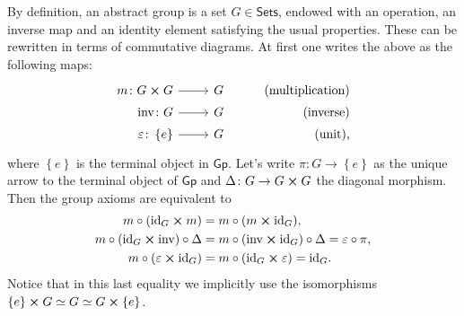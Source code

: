 \begin{rem}[]
	By definition, an abstract group is a set $G \in \mathsf{Sets}$, endowed with an operation,
	an inverse map and an identity element satisfying the usual properties.
	These can be rewritten in terms of commutative diagrams.
	At first one writes the above as the following maps:
	\begin{equation*}
	\begin{tikzcd}[row sep = 0ex
         ,/tikz/column 1/.append style={anchor=base east}
         ,/tikz/column 2/.append style={anchor=base west}
         ,/tikz/column 3/.append style={anchor=base east}]
			m\colon G \cross G \arrow[r, "", rightarrow] &
			G & \text{(multiplication)} \\
			\mathrm{inv}\colon G \arrow[r, "", rightarrow] &
			G & \text{(inverse)} \\
			\varepsilon \colon \left\{ e \right\} \arrow[r, "", rightarrow] &
			G & \text{(unit),}
		\end{tikzcd}
	\end{equation*} 
	where $\left\{ e \right\}$ is the terminal object in $\mathsf{Gp}$.
	Let's write $\pi\colon G \to \left\{ e \right\}$
	as the unique arrow to the terminal object of $\mathsf{Gp}$
	and $\Delta\colon G \to G \cross G$ the diagonal morphism.
	Then the group axioms are equivalent to
	\begin{align}\label{eq:GroupAxioms}
		m \circ (\mathrm{id}_{ G } \cross m) &= m \circ (m \cross \mathrm{id}_{ G }),\nonumber\\
		m \circ (\mathrm{id}_{ G } \cross \mathrm{inv}) \circ \Delta &=
		m \circ (\mathrm{inv} \cross \mathrm{id}_{ G }) \circ \Delta = \varepsilon \circ \pi,\\
		m \circ (\varepsilon \cross \mathrm{id}_{ G }) &=
		m \circ (\mathrm{id}_{ G } \cross \varepsilon) = \mathrm{id}_{ G }\nonumber
	.\end{align} 
	Notice that in this last equality we implicitly use the isomorphisms
	$\left\{ e \right\} \cross G \simeq G \simeq G \cross \left\{ e \right\}$.
\end{rem}


